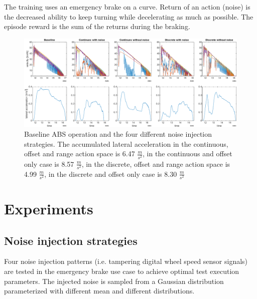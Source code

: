 \documentclass[a4paper, fleqn]{cas-dc}
\begin{document}
	The training uses an emergency brake on a curve. Return of an action (noise) is the decreased ability to keep turning while decelerating as much as possible. The episode reward is the sum of the returns during the braking.
	
	\begin{figure}[ht]
		\centering
		\includegraphics[width=\textwidth]{figures/SAC_all_performance.pdf}
		\caption{Baseline ABS operation and the four different noise injection strategies. The accumulated lateral acceleration in the continuous, offset and range action space is 6.47 $\frac{m}{s^2}$, in the continuous and offset only case is 8.57 $\frac{m}{s^2}$, in the discrete, offset and range action space is 4.99 $\frac{m}{s^2}$, in the discrete and offset only case is 8.30 $\frac{m}{s^2}$ }
		\label{FIG:Performance}
	\end{figure}

	\section{Experiments}
	\subsection{Noise injection strategies}
	
	Four noise injection patterns (i.e. tampering digital wheel speed sensor signals) are tested in the emergency brake use case to achieve optimal test execution parameters. The injected noise is sampled from a Gaussian distribution parameterized with different mean and different distributions.
	
\end{document}
